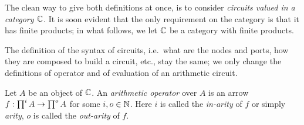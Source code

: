 The clean way to give both definitions at once, is to consider
\emph{circuits valued
  in a category $\mathbb{C}$}.  It is soon evident that the only requirement
on the category is that it has finite products; in what follows, we
let $\mathbb{C}$ be a category with finite products.
  
The definition of the syntax of circuits, i.e.\ what are the nodes and
ports, how they are composed to build a circuit, etc., stay the same;
we only change the definitions of operator and of evaluation of an
arithmetic circuit.
  
\begin{definition}
  Let $A$ be an object of $\mathbb{C}$.  An
  \emph{arithmetic operator} over $A$ is an
  arrow $f:\prod^iA\rightarrow\prod^oA$ for some $i,o\in\mathbb{N}$. Here $i$ is
  called the \emph{in-arity} of $f$ or simply
  \emph{arity}, $o$ is called the \emph{out-arity} of $f$.
\end{definition}
  
